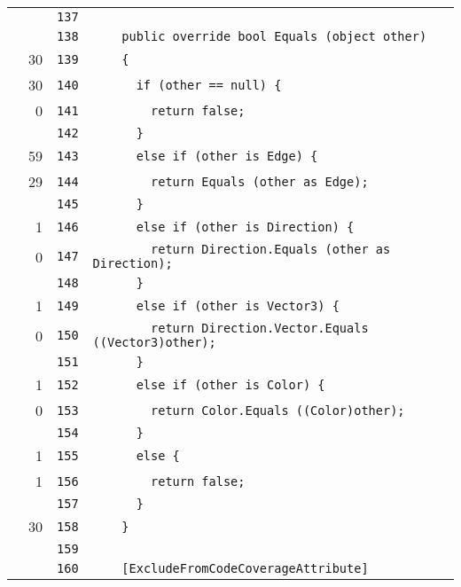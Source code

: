 \documentclass[a4paper,10pt]{article}
\begin{document}
\begin{longtable}[l]{lrrl}
\cellcolor{gray} &  & \verb~137~ & \verb~~\\
\cellcolor{gray} &  & \verb~138~ & \verb~    public override bool Equals (object other)~\\
\cellcolor{green} & 30 & \verb~139~ & \verb~    {~\\
\cellcolor{green} & 30 & \verb~140~ & \verb~      if (other == null) {~\\
\cellcolor{red} & 0 & \verb~141~ & \verb~        return false;~\\
\cellcolor{gray} &  & \verb~142~ & \verb~      }~\\
\cellcolor{green} & 59 & \verb~143~ & \verb~      else if (other is Edge) {~\\
\cellcolor{green} & 29 & \verb~144~ & \verb~        return Equals (other as Edge);~\\
\cellcolor{gray} &  & \verb~145~ & \verb~      }~\\
\cellcolor{green} & 1 & \verb~146~ & \verb~      else if (other is Direction) {~\\
\cellcolor{red} & 0 & \verb~147~ & \verb~        return Direction.Equals (other as Direction);~\\
\cellcolor{gray} &  & \verb~148~ & \verb~      }~\\
\cellcolor{green} & 1 & \verb~149~ & \verb~      else if (other is Vector3) {~\\
\cellcolor{red} & 0 & \verb~150~ & \verb~        return Direction.Vector.Equals ((Vector3)other);~\\
\cellcolor{gray} &  & \verb~151~ & \verb~      }~\\
\cellcolor{green} & 1 & \verb~152~ & \verb~      else if (other is Color) {~\\
\cellcolor{red} & 0 & \verb~153~ & \verb~        return Color.Equals ((Color)other);~\\
\cellcolor{gray} &  & \verb~154~ & \verb~      }~\\
\cellcolor{green} & 1 & \verb~155~ & \verb~      else {~\\
\cellcolor{green} & 1 & \verb~156~ & \verb~        return false;~\\
\cellcolor{gray} &  & \verb~157~ & \verb~      }~\\
\cellcolor{green} & 30 & \verb~158~ & \verb~    }~\\
\cellcolor{gray} &  & \verb~159~ & \verb~~\\
\cellcolor{gray} &  & \verb~160~ & \verb~    [ExcludeFromCodeCoverageAttribute]~\\

\end{longtable}
\end{document}
